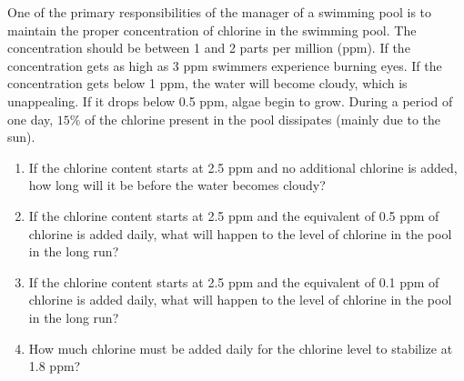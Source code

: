 \documentclass[10pt,]{book}
\theoremstyle{ptxdefinitionnotitle}
\theoremstyle{ptxdefinitiontitle}
\theoremstyle{ptxdefinitionnotitle}
\theoremstyle{ptxdefinitiontitle}
\theoremstyle{ptxdefinitionnotitle}
\theoremstyle{ptxdefinitiontitle}
\numberwithin{equation}{section}
\begin{document}
\begin{divisionexercise}{5}\hypertarget{exercise-7}{}
\hypertarget{p-25}{}%
One of the primary responsibilities of the manager of a swimming pool is to maintain the proper concentration of chlorine in the swimming pool.  The concentration should be between 1 and 2 parts per million (ppm).  If the concentration gets as high as 3 ppm swimmers experience burning eyes.  If the concentration gets below 1 ppm, the water will become cloudy, which is unappealing.  If it drops below 0.5 ppm, algae begin to grow.  During a period of one day, \(15\%\) of the chlorine present in the pool dissipates (mainly due to the sun). \leavevmode%
\begin{enumerate}[label=(\alph*)]
\item\hypertarget{li-21}{}If the chlorine content starts at 2.5 ppm and no additional chlorine is added, how long will it be before the water becomes cloudy?%
\item\hypertarget{li-22}{}If the chlorine content starts at 2.5 ppm and the equivalent of 0.5 ppm of chlorine is added daily, what will happen to the level of chlorine in the pool in the long run?%
\item\hypertarget{li-23}{}If the chlorine content starts at 2.5 ppm and the equivalent of 0.1 ppm of chlorine is added daily, what will happen to the level of chlorine in the pool in the long run?%
\item\hypertarget{li-24}{}How much chlorine must be added daily for the chlorine level to stabilize at 1.8 ppm?%
\end{enumerate}
%
\end{divisionexercise}%
\end{document}
